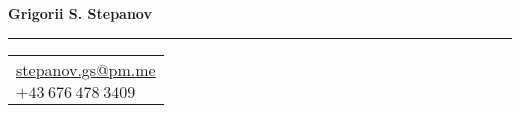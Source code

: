 \documentclass[letterpaper,11pt,oneside]{article}
\begin{document}

\noindent  \LARGE{\textbf{Grigorii S. Stepanov}} \\
\vspace{-2ex} 
\hrule 
\normalsize


\begin{flushright}
    \begin{tabular}{l}
        \href{mailto:stepanov.gs@pm.me}{stepanov.gs@pm.me} \\
        $+43 \ 676 \ 478\ 3409$ 
    \end{tabular}
\end{flushright}

\vspace{1em}  %

\end{document}
